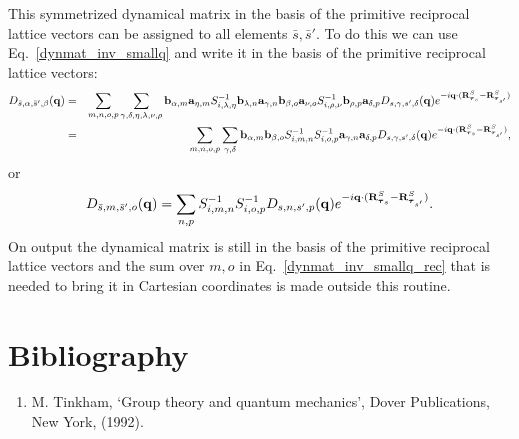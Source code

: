 \documentclass[12pt,a4paper,twoside]{report}
\begin{document}
This symmetrized dynamical matrix in the basis
of the primitive reciprocal lattice vectors 
can be assigned to all elements $\bar s, \bar s'$.
To do this we can use Eq.~\ref{dynmat_inv_smallq}
and write it in the basis of the primitive reciprocal lattice vectors:
\begin{eqnarray}
D_{\bar s,\alpha,\bar s',\beta}({\bf q}) &=&
\sum_{m,n,o,p} \sum_{\gamma,\delta,\eta,\lambda,\nu,\rho} {\bf b}_{\alpha,m} {\bf a}_{\eta,m} S^{-1}_{i,\lambda,\eta} {\bf b}_{\lambda,n} {\bf a}_{\gamma,n} {\bf b}_{\beta,o} {\bf a}_{\nu,o}  S^{-1}_{i,\rho,\nu} {\bf b}_{\rho,p} {\bf a}_{\delta,p}
D_{s,\gamma,s',\delta}({\bf q})
e^{-i {\bf q} \cdot ({\bf R}^{S}_{\boldsymbol{\tau}_s} - {\bf R}^{S}_{\boldsymbol{\tau}_{s'}})} \nonumber \\
&=& \sum_{m,n,o,p} \sum_{\gamma,\delta} {\bf b}_{\alpha,m} {\bf b}_{\beta,o}  S^{-1}_{i,m,n}    S^{-1}_{i,o,p} {\bf a}_{\gamma,n} {\bf a}_{\delta,p}
D_{s,\gamma,s',\delta}({\bf q})
e^{-i {\bf q} \cdot ({\bf R}^{S}_{\boldsymbol{\tau}_s} - {\bf R}^{S}_{\boldsymbol{\tau}_{s'}})}, 
\label{dynmat_inv_smallq_rec}
\end{eqnarray}
or
\begin{equation}
D_{\bar s,m,\bar s',o}({\bf q}) =
\sum_{n,p}  S^{-1}_{i,m,n}    S^{-1}_{i,o,p} 
D_{s,n,s',p}({\bf q})
e^{-i {\bf q} \cdot ({\bf R}^{S}_{\boldsymbol{\tau}_s} - {\bf R}^{S}_{\boldsymbol{\tau}_{s'}})}.
\end{equation}
On output the dynamical matrix is still in the basis of the primitive reciprocal lattice vectors and the sum over $m,o$ in Eq.~\ref{dynmat_inv_smallq_rec} that is needed to bring it in Cartesian coordinates is made outside this routine.

\newpage

{\color{dark-blue}\chapter{Bibliography}}
\color{black}

\begin{enumerate}

\item
M. Tinkham, `Group theory and quantum mechanics', Dover Publications, New York,
(1992). 

\end{enumerate}
\end{document}
